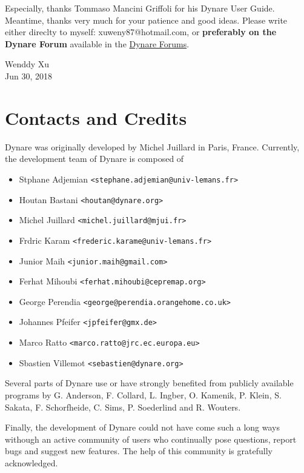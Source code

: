\documentclass[cn,10pt,math=newtx,citestyle=gb7714-2015,bibstyle=gb7714-2015]{elegantbook}
\begin{document}
	Especially, thanks Tommaso Mancini Griffoli for his Dynare User Guide. Meantime, thanks very much for your patience and good ideas. Please write either direclty to myself: xuweny87@hotmail.com, or \textbf{preferably on the Dynare Forum} available in the \href{http://forum.dynare.org}{Dynare Forums}.
	
	
	
	\vskip 1.5cm
	
	\begin{flushright}
		Wenddy Xu\\
		Jun 30, 2018
	\end{flushright}

\chapter*{Contacts and Credits} 
Dynare was originally developed by Michel Juillard in Paris, France. Currently, the development team of Dynare is composed of

\begin{itemize}
	\item Stphane Adjemian \texttt{<stephane.adjemian@univ-lemans.fr>}
	\item Houtan Bastani \texttt{<houtan@dynare.org>}
	\item Michel Juillard \texttt{<michel.juillard@mjui.fr>}
	\item Frdric Karam \texttt{<frederic.karame@univ-lemans.fr>}
	\item Junior Maih \texttt{<junior.maih@gmail.com>}
	\item Ferhat Mihoubi \texttt{<ferhat.mihoubi@cepremap.org>}
	\item George Perendia \texttt{<george@perendia.orangehome.co.uk>}
	\item Johannes Pfeifer \texttt{<jpfeifer@gmx.de>}
	\item Marco Ratto \texttt{<marco.ratto@jrc.ec.europa.eu>}
	\item Sbastien Villemot \texttt{<sebastien@dynare.org>}
\end{itemize}

Several parts of Dynare use or have strongly benefited from publicly available programs by G. Anderson, F. Collard, L. Ingber, O. Kamenik, P. Klein, S. Sakata, F. Schorfheide, C. Sims, P. Soederlind and R. Wouters.

Finally, the development of Dynare could not have come such a long ways withough an active community of users who continually pose questions, report bugs and suggest new features. The help of this community is gratefully acknowledged.\\
\end{document}
